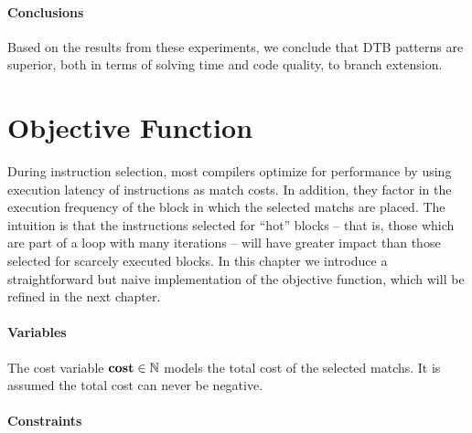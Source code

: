 \paragraph{Conclusions}

Based on the results from these experiments, we conclude that \glspl{DTB
  pattern} are superior, both in terms of solving time and code quality, to
\gls{branch extension}.


\section{Objective Function}

During \gls{instruction selection}, most \glspl{compiler} optimize for
performance by using execution latency of \glspl{instruction} as \gls{match}
costs.
%
In addition, they factor in the execution frequency of the \gls{block} in which
the selected \glspl{match} are placed.
%
The intuition is that the \glspl{instruction} selected for ``hot'' \glspl{block}
-- that is, those which are part of a loop with many iterations -- will have
greater impact than those selected for scarcely executed \glspl{block}.
%
In this chapter we introduce a straightforward but naive implementation of the
\gls{objective function}, which will be refined in the next chapter.


\paragraph{Variables}

The \gls{cost variable} \mbox{$\mVar{cost} \in \mathbb{N}$} models the total
cost of the selected \glspl{match}.
%
It is assumed the total cost can never be negative.


\paragraph{Constraints}

